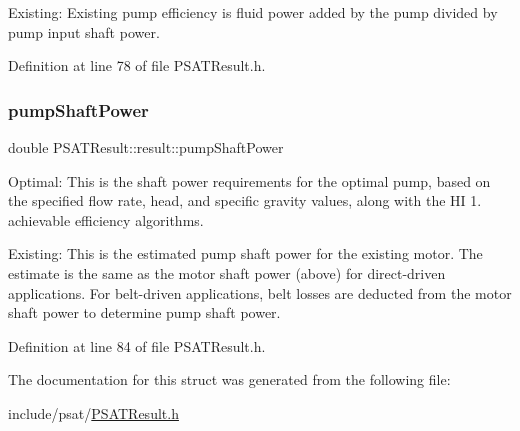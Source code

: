 Existing\+: Existing pump efficiency is fluid power added by the pump divided by pump input shaft power. 

Definition at line 78 of file P\+S\+A\+T\+Result.\+h.

\mbox{\label{struct_p_s_a_t_result_1_1result_ae0b7e90c8f6e8ba8afc1b85c11fcedff}} 
\subsubsection{\texorpdfstring{pump\+Shaft\+Power}{pumpShaftPower}}
{\footnotesize\ttfamily double P\+S\+A\+T\+Result\+::result\+::pump\+Shaft\+Power}



Optimal\+: This is the shaft power requirements for the optimal pump, based on the specified flow rate, head, and specific gravity values, along with the HI 1. achievable efficiency algorithms. 

Existing\+: This is the estimated pump shaft power for the existing motor. The estimate is the same as the motor shaft power (above) for direct-\/driven applications. For belt-\/driven applications, belt losses are deducted from the motor shaft power to determine pump shaft power. 

Definition at line 84 of file P\+S\+A\+T\+Result.\+h.



The documentation for this struct was generated from the following file\+:\begin{DoxyCompactItemize}
\item 
include/psat/\hyperlink{_p_s_a_t_result_8h}{P\+S\+A\+T\+Result.\+h}\end{DoxyCompactItemize}
